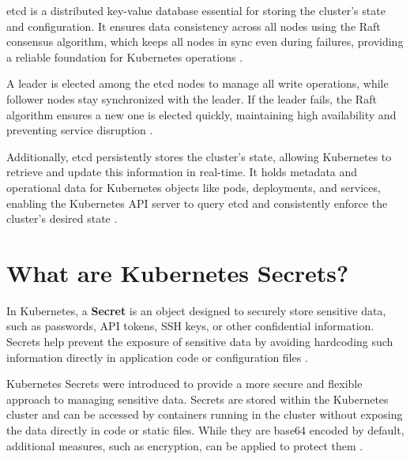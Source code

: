 \documentclass[a4paper,11pt,openright,BCOR=15mm]{scrbook}
\begin{document}
etcd is a distributed key-value database essential for storing the cluster’s state and configuration. It ensures data consistency across all nodes using the Raft consensus algorithm, which keeps all nodes in sync even during failures, providing a reliable foundation for Kubernetes operations \cite{etcd_faq_2024}.

A leader is elected among the etcd nodes to manage all write operations, while follower nodes stay synchronized with the leader. If the leader fails, the Raft algorithm ensures a new one is elected quickly, maintaining high availability and preventing service disruption \cite{etcd_faq_2024}.

Additionally, etcd persistently stores the cluster's state, allowing Kubernetes to retrieve and update this information in real-time. It holds metadata and operational data for Kubernetes objects like pods, deployments, and services, enabling the Kubernetes API server to query etcd and consistently enforce the cluster’s desired state \cite{etcd_faq_2024}.

\section{What are Kubernetes Secrets?}

In Kubernetes, a \textbf{Secret} is an object designed to securely store sensitive data, such as passwords, API tokens, SSH keys, or other confidential information. Secrets help prevent the exposure of sensitive data by avoiding hardcoding such information directly in application code or configuration files \cite{the_linux_foundation_secrets_2024}.

Kubernetes Secrets were introduced to provide a more secure and flexible approach to managing sensitive data. Secrets are stored within the Kubernetes cluster and can be accessed by containers running in the cluster without exposing the data directly in code or static files. While they are base64 encoded by default, additional measures, such as encryption, can be applied to protect them \cite{the_linux_foundation_secrets_2024}.
\end{document}
